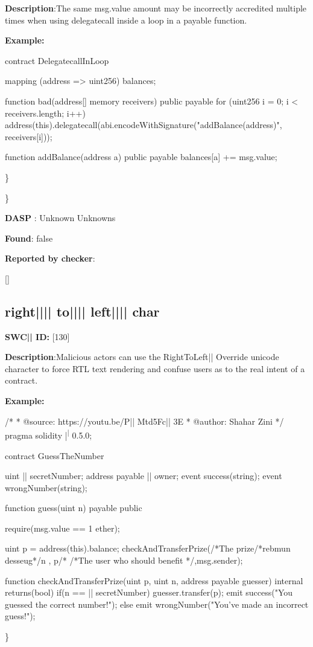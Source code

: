 \documentclass{article}
\begin{document}
\textbf{Description}:The same msg.value amount may be incorrectly accredited multiple times when using delegatecall inside a loop in a payable function.


\textbf{Example:} 
\begin{ffcode} 

contract DelegatecallInLoop{

    mapping (address => uint256) balances;

    function bad(address[] memory receivers) public payable {
        for (uint256 i = 0; i < receivers.length; i++) {
            address(this).delegatecall(abi.encodeWithSignature("addBalance(address)", receivers[i]));
        }
    }

    function addBalance(address a) public payable {
        balances[a] += msg.value;
    }
}

\end{ffcode} 
\} 

\} 

\textbf{DASP} : Unknown Unknowns

\textbf{Found}: false

\textbf{Reported by checker}: 
\begin{ffcode} 

[]
\end{ffcode} 
\subsection{right{||\textunderscore|| }to{||\textunderscore|| }left{||\textunderscore|| }char} 
\textbf{SWC{|\textunderscore| }ID:} [130]

\textbf{Description}:Malicious actors can use the Right{\textendash}To{\textendash}Left|\textendash| Override unicode character to force RTL text rendering and confuse users as to the real intent of a contract.


\textbf{Example:} 
\begin{ffcode} 

/*
* @source: https://youtu.be/P|\textunderscore| Mtd5Fc|\textunderscore| 3E
* @author: Shahar Zini
*/
pragma solidity |\textsuperscript| 0.5.0;

contract GuessTheNumber
{
    uint |\textunderscore| secretNumber;
    address payable |\textunderscore| owner;
    event success(string);
event wrongNumber(string);

    function guess(uint n) payable public
    {
        require(msg.value == 1 ether);

        uint p = address(this).balance;
        checkAndTransferPrize(/*The prize/*rebmun desseug*/n , p/*
                /*The user who should benefit */,msg.sender);
    }

    function checkAndTransferPrize(uint p, uint n, address payable guesser) internal returns(bool)
    {
        if(n == |\textunderscore| secretNumber)
        {
            guesser.transfer(p);
            emit success("You guessed the correct number!");
        }
        else
        {
            emit wrongNumber("You've made an incorrect guess!");
        }
    }
  }

\end{ffcode} 
\} 
\end{document}
